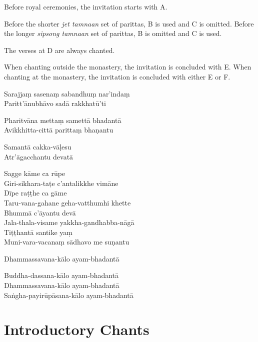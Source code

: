 Before royal ceremonies, the invitation starts with A.

Before the shorter \emph{jet tamnaan} set of parittas, B is used and C is
omitted. Before the longer \emph{sipsong tamnaan} set of parittas, B is
omitted and C is used.

The verses at D are always chanted.

When chanting outside the monastery, the invitation is concluded with E. When
chanting at the monastery, the invitation is concluded with either E or F.

\clearpage

\begin{paritta}


%
Sarajjaṃ sasenaṃ sabandhuṃ nar'indaṃ\\
Paritt'ānubhāvo sadā rakkhatū'ti

%
Pharitvāna mettaṃ samettā bhadantā\\
Avikkhitta-cittā parittaṃ bhaṇantu

%
Samantā cakka-vāḷesu\\
Atr'āgacchantu devatā

%
Sagge kāme ca rūpe\\
Giri-sikhara-taṭe c'antalikkhe vimāne\\
Dīpe raṭṭhe ca gāme\\
Taru-vana-gahane geha-vatthumhi khette\\
Bhummā c'āyantu devā\\
Jala-thala-visame yakkha-gandhabba-nāgā\\
Tiṭṭhantā santike yaṃ\\
Muni-vara-vacanaṃ sādhavo me suṇantu

%
Dhammassavana-kālo ayam-bhadantā


%
Buddha-dassana-kālo ayam-bhadantā\\
Dhammassavana-kālo ayam-bhadantā\\
Saṅgha-payirūpāsana-kālo ayam-bhadantā
\end{paritta}


\clearpage

\section{Introductory Chants}

